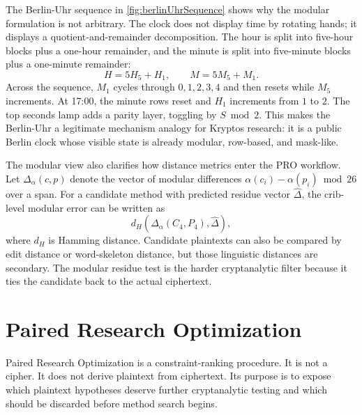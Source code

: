 \documentclass[12pt]{paperFormatting}
\newcommand{\Cipher}{C}
\newcommand{\Plain}{P}
\begin{document}
\begin{thesisbody}
The Berlin-Uhr sequence in \autoref{fig:berlinUhrSequence} shows why the modular formulation is not arbitrary. The clock does not display time by rotating hands; it displays a quotient-and-remainder decomposition. The hour is split into five-hour blocks plus a one-hour remainder, and the minute is split into five-minute blocks plus a one-minute remainder:
\begin{equation}
    H = 5H_5 + H_1,\qquad M = 5M_5 + M_1.
\end{equation}
Across the sequence, $M_1$ cycles through $0,1,2,3,4$ and then resets while $M_5$ increments. At 17:00, the minute rows reset and $H_1$ increments from $1$ to $2$. The top seconds lamp adds a parity layer, toggling by $S \bmod 2$. This makes the Berlin-Uhr a legitimate mechanism analogy for Kryptos research: it is a public Berlin clock whose visible state is already modular, row-based, and mask-like.

The modular view also clarifies how distance metrics enter the PRO workflow. Let $\Delta_{\alpha}(c,p)$ denote the vector of modular differences $\alpha(c_i)-\alpha(p_i) \bmod 26$ over a span. For a candidate method with predicted residue vector $\widehat{\Delta}$, the crib-level modular error can be written as
\begin{equation}
    d_H\!\left(\Delta_{\alpha}(\Cipher_4,\Plain_4),\widehat{\Delta}\right),
\end{equation}
where $d_H$ is Hamming distance. Candidate plaintexts can also be compared by edit distance or word-skeleton distance, but those linguistic distances are secondary. The modular residue test is the harder cryptanalytic filter because it ties the candidate back to the actual ciphertext.

\section{Paired Research Optimization}
Paired Research Optimization is a constraint-ranking procedure. It is not a cipher. It does not derive plaintext from ciphertext. Its purpose is to expose which plaintext hypotheses deserve further cryptanalytic testing and which should be discarded before method search begins.


\end{thesisbody}
\end{document}
